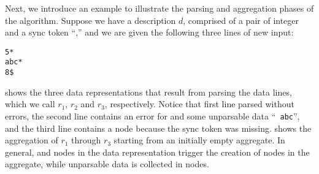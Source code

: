 
Next, we introduce an example to illustrate the parsing and
aggregation phases of the algorithm. 
Suppose we have a description $d$, comprised of a pair of integer and a sync token ``\cd{*},''
and we are given the following three lines of new input:
{\small
\begin{verbatim}
5*
abc*
8$
\end{verbatim}
}
%
\noindent
{} shows the three data representations that result
from parsing the data lines, which we call $r_1$, $r_2$ and $r_3$,
respectively. Notice that first line parsed without errors, the second
line contains an error for  and some unparsable data ``{\tt
  abc}'', and the third line contains a  node because the
sync token was missing.   shows the aggregation
of $r_1$ through $r_3$ starting from an initially empty aggregate. In
general,  and  nodes in the data representation
trigger the creation of  nodes in the aggregate, while
unparsable data is collected in  nodes.


%

